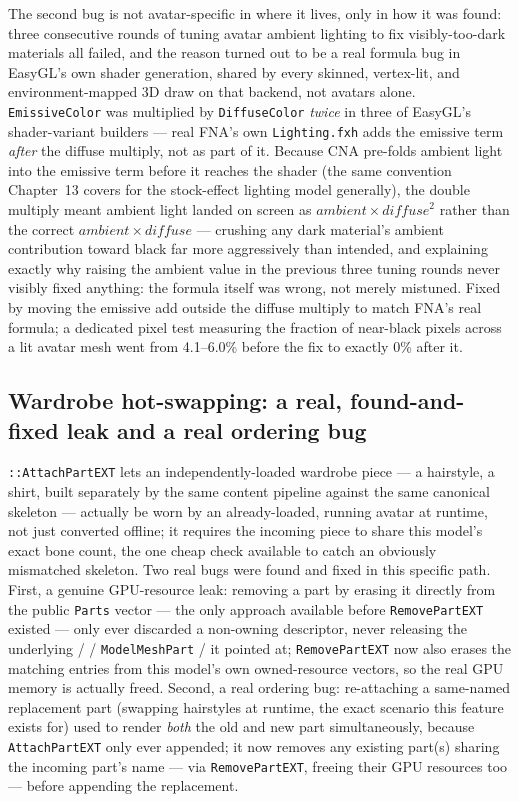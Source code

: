 The second bug is not avatar-specific in where it lives, only in how it was found: three
consecutive rounds of tuning avatar ambient lighting to fix visibly-too-dark materials all
failed, and the reason turned out to be a real formula bug in EasyGL's own shader generation,
shared by every skinned, vertex-lit, and environment-mapped 3D draw on that backend, not
avatars alone. \texttt{EmissiveColor} was multiplied by \texttt{DiffuseColor} \emph{twice} in
three of EasyGL's shader-variant builders --- real FNA's own \texttt{Lighting.fxh} adds the
emissive term \emph{after} the diffuse multiply, not as part of it. Because CNA pre-folds
ambient light into the emissive term before it reaches the shader (the same convention
Chapter~13 covers for the stock-effect lighting model generally), the double multiply meant
ambient light landed on screen as $\mathit{ambient} \times \mathit{diffuse}^2$ rather than the
correct $\mathit{ambient} \times \mathit{diffuse}$ --- crushing any dark material's ambient
contribution toward black far more aggressively than intended, and explaining exactly why
raising the ambient value in the previous three tuning rounds never visibly fixed anything: the
formula itself was wrong, not merely mistuned. Fixed by moving the emissive add outside the
diffuse multiply to match FNA's real formula; a dedicated pixel test measuring the fraction of
near-black pixels across a lit avatar mesh went from 4.1--6.0\% before the fix to exactly 0\%
after it.

\subsection{Wardrobe hot-swapping: a real, found-and-fixed leak and a real ordering bug}

\texttt{::AttachPartEXT} lets an independently-loaded wardrobe piece
--- a hairstyle, a shirt, built separately by the same content pipeline against the same
canonical skeleton --- actually be worn by an already-loaded, running avatar at runtime, not
just converted offline; it requires the incoming piece to share this model's exact bone count,
the one cheap check available to catch an obviously mismatched skeleton. Two real bugs were
found and fixed in this specific path. First, a genuine GPU-resource leak: removing a part by
erasing it directly from the public \texttt{Parts} vector --- the only approach available
before \texttt{RemovePartEXT} existed --- only ever discarded a non-owning descriptor,
never releasing the underlying  /  /
\texttt{ModelMeshPart} /  it pointed at; \texttt{RemovePartEXT} now also
erases the matching entries from this model's own owned-resource vectors, so the real GPU
memory is actually freed. Second, a real ordering bug: re-attaching a same-named replacement
part (swapping hairstyles at runtime, the exact scenario this feature exists for) used to
render \emph{both} the old and new part simultaneously, because \texttt{AttachPartEXT} only
ever appended; it now removes any existing part(s) sharing the incoming part's name --- via
\texttt{RemovePartEXT}, freeing their GPU resources too --- before appending the replacement.

